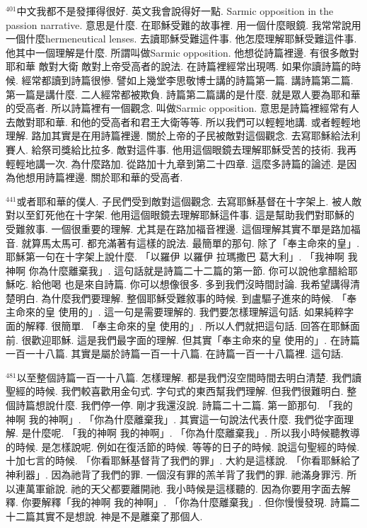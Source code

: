\documentclass{book}
\begin{document}
$^{401}$中文我都不是發揮得很好.
英文我會說得好一點.
Sarmic opposition in the passion narrative.
意思是什麼.
在耶穌受難的故事裡.
用一個什麼眼鏡.
我常常說用一個什麼hermeneutical lenses.
去讀耶穌受難這件事.
他怎麼理解耶穌受難這件事.
他其中一個理解是什麼.
所謂叫做Sarmic opposition.
他想從詩篇裡邊.
有很多敵對耶和華 敵對大衛 敵對上帝受高者的說法.
在詩篇裡經常出現嗎.
如果你讀詩篇的時候.
經常都讀到詩篇很慘.
譬如上幾堂李思敬博士講的詩篇第一篇.
講詩篇第二篇.
第一篇是講什麼.
二人經常都被欺負.
詩篇第二篇講的是什麼.
就是眾人要為耶和華的受高者.
所以詩篇裡有一個觀念.
叫做Sarmic opposition.
意思是詩篇裡經常有人去敵對耶和華.
和他的受高者和君王大衛等等.
所以我們可以輕輕地講.
或者輕輕地理解.
路加其實是在用詩篇裡邊.
關於上帝的子民被敵對這個觀念.
去寫耶穌給法利賽人.
給祭司獎給比拉多.
敵對這件事.
他用這個眼鏡去理解耶穌受苦的技術.
我再輕輕地講一次.
為什麼路加.
從路加十九章到第二十四章.
這麼多詩篇的論述.
是因為他想用詩篇裡邊.
關於耶和華的受高者.

$^{441}$或者耶和華的僕人.
子民們受到敵對這個觀念.
去寫耶穌基督在十字架上.
被人敵對以至釘死他在十字架.
他用這個眼鏡去理解耶穌這件事.
這是幫助我們對耶穌的受難敘事.
一個很重要的理解.
尤其是在路加福音裡邊.
這個理解其實不單是路加福音.
就算馬太馬可.
都充滿著有這樣的說法.
最簡單的那句.
除了「奉主命來的皇」.
耶穌第一句在十字架上說什麼.
「以羅伊 以羅伊 拉瑪撒巴 葛大利」.
「我神啊 我神啊 你為什麼離棄我」.
這句話就是詩篇二十二篇的第一節.
你可以說他拿醋給耶穌吃.
給他喝 也是來自詩篇.
你可以想像很多.
多到我們沒時間討論.
我希望講得清楚明白.
為什麼我們要理解.
整個耶穌受難敘事的時候.
到盧驅子進來的時候.
「奉主命來的皇 使用的」.
這一句是需要理解的.
我們要怎樣理解這句話.
如果純粹字面的解釋.
很簡單.
「奉主命來的皇 使用的」.
所以人們就把這句話.
回答在耶穌面前.
很歡迎耶穌.
這是我們最字面的理解.
但其實「奉主命來的皇 使用的」.
在詩篇一百一十八篇.
其實是屬於詩篇一百一十八篇.
在詩篇一百一十八篇裡.
這句話.

$^{481}$以至整個詩篇一百一十八篇.
怎樣理解.
都是我們沒空間時間去明白清楚.
我們讀聖經的時候.
我們較喜歡用金句式.
字句式的東西幫我們理解.
但我們很難明白.
整個詩篇想說什麼.
我們停一停.
剛才我還沒說.
詩篇二十二篇.
第一節那句.
「我的神啊 我的神啊」.
「你為什麼離棄我」.
其實這一句說法代表什麼.
我們從字面理解.
是什麼呢.
「我的神啊 我的神啊」.
「你為什麼離棄我」.
所以我小時候聽教導的時候.
是怎樣說呢.
例如在復活節的時候.
等等的日子的時候.
說這句聖經的時候.
十加七言的時候.
「你看耶穌基督背了我們的罪」.
大約是這樣說.
「你看耶穌給了神利器」.
因為祂背了我們的罪.
一個沒有罪的羔羊背了我們的罪.
祂滿身罪污.
所以連萬軍爺說.
祂的天父都要離開祂.
我小時候是這樣聽的.
因為你要用字面去解釋.
你要解釋「我的神啊 我的神啊」.
「你為什麼離棄我」.
但你慢慢發現.
詩篇二十二篇其實不是想說.
神是不是離棄了那個人.
\end{document}
